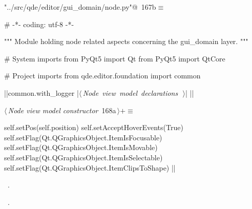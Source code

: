 \documentclass[%
    a4paper,    %
    justified,  %
    nobib,      %
    openany     %
]{tufte-book}
\begin{document}
\begin{flushleft} \small
\begin{minipage}{\linewidth}\label{scrap188}\raggedright\small
{} \verb@"../src/qde/editor/gui_domain/node.py"@\nobreak\ {\footnotesize {167b}}$\equiv$
\vspace{-1ex}
\begin{pythoncode}
# -*- coding: utf-8 -*-

""" Module holding node related aspects concerning the gui_domain layer. """

# System imports
from PyQt5 import Qt
from PyQt5 import QtCore

# Project imports
from qde.editor.foundation import common

|\normalfont{}\fontfamily{}|common.with_logger
|\hbox{$\langle\,${\itshape Node view model declarations}\nobreak\ {\footnotesize {}}$\,\rangle$}|
|\NWsep|
\end{pythoncode}
\vspace{1.5ex}
\footnotesize
\begin{list}{}{\setlength{\itemsep}{-\parsep}\setlength{\itemindent}{-\leftmargin}}

\item{}
\end{list}
\end{minipage}\vspace{4ex}
\end{flushleft}
\begin{flushleft} \small
\begin{minipage}{\linewidth}\label{scrap189}\raggedright\small
{} $\langle\,${\itshape Node view model constructor}\nobreak\ {\footnotesize {168a}}$\,\rangle+\equiv$
\vspace{-1ex}
\begin{pythoncode}
    self.setPos(self.position)
    self.setAcceptHoverEvents(True)
    self.setFlag(Qt.QGraphicsObject.ItemIsFocusable)
    self.setFlag(Qt.QGraphicsObject.ItemIsMovable)
    self.setFlag(Qt.QGraphicsObject.ItemIsSelectable)
    self.setFlag(Qt.QGraphicsObject.ItemClipsToShape)
|\NWsep|
\end{pythoncode}
\vspace{1.5ex}
\footnotesize
\begin{list}{}{\setlength{\itemsep}{-\parsep}\setlength{\itemindent}{-\leftmargin}}
\item \NWtxtMacroDefBy\ .
\item \NWtxtMacroRefIn\ .

\item{}
\end{list}
\end{minipage}\vspace{4ex}
\end{flushleft}
\end{document}
